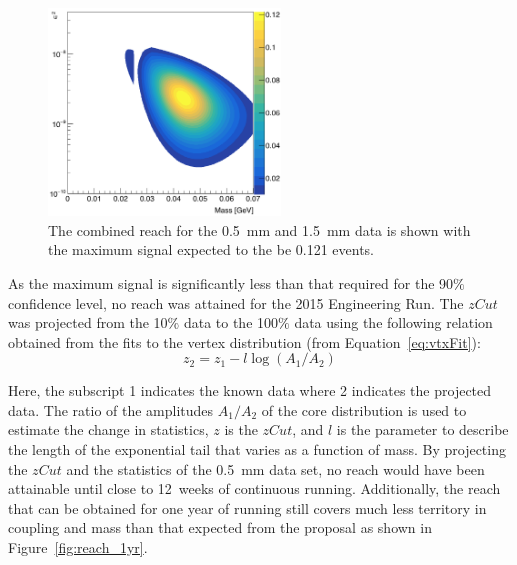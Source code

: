 \begin{figure}[htb]
  \centering
      \includegraphics[width=0.55\textwidth]{pics/results/combinedReach.png}
  \caption[Combined reach from all data for the 2015 Engineering Run]{The combined reach for the 0.5~mm and 1.5~mm data is shown with the maximum signal expected to the be 0.121 events.}
  \label{fig:comb_reach}
\end{figure} 

As the maximum signal is significantly less than that required for the 90$\%$ confidence level, no reach was attained for the 2015 Engineering Run. The $zCut$ was projected from the 10$\%$ data to the 100$\%$ data using the following relation obtained from the fits to the vertex distribution (from Equation~\eqref{eq:vtxFit}):
\begin{equation}
\label{eq:zProjected}
z_{2} = z_{1} - l\log(A_1/A_2)
\end{equation}

Here, the subscript 1 indicates the known data where 2 indicates the projected data. The ratio of the amplitudes $A_1/A_2$ of the core distribution is used to estimate the change in statistics, $z$ is the $zCut$, and $l$ is the parameter to describe the length of the exponential tail that varies as a function of mass. By projecting the $zCut$ and the statistics of the 0.5~mm data set, no reach would have been attainable until close to 12~weeks of continuous running. Additionally, the reach that can be obtained for one year of running still covers much less territory in coupling and mass than that expected from the proposal as shown in Figure~\ref{fig:reach_1yr}.

